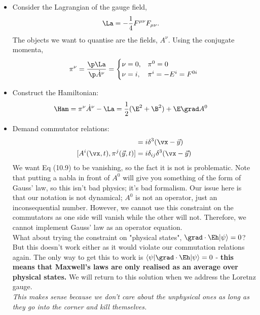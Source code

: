 \documentclass[a4paper, 11pt, normalem]{report}
\begin{document}
\begin{itemize}
    \item Consider the Lagrangian of the gauge field,
        \begin{align}
            \La &= -\frac14 F^{\mu\nu}F_{\mu\nu}.
        \end{align}
        The objects we want to quantise are the fields, $A^\nu$.
        Using the conjugate momenta,
        \begin{align}
            \pi^\nu &= \frac{\p\La}{\p\dot{A}^\nu} = \begin{cases} \nu = 0, & \pi^0 = 0 \\ \nu = i, & \pi^i = -E^i = F^{0i}\end{cases} \\
        \end{align}
    \item Construct the Hamiltonian:
        \begin{align}
            \Ham &= \pi^\nu\dot{A}^\nu - \La = \frac12(\E^2+\B^2) + \E\grad A^0
        \end{align}
    \item Demand commutator relations:
        \begin{align}
            [A^0(\vx,t),\pi^0(\vec{y},t)] &= i\delta^3(\vx-\vec{y}) \\
            [A^i(\vx,t),\pi^j(\vec{y},t)] &= i\delta_{ij}\delta^3(\vx-\vec{y})
        \end{align}
        We want Eq (10.9) to be vanishing, so the fact it is not is problematic. 
        Note that putting a nabla in front of $A^0$ will give you something of the form of Gauss' law, so this isn't bad physics; it's bad formalism.
        Our issue here is that our notation is not dynamical; $A^0$ is not an operator, just an inconsequential number.
        However, we cannot use this constraint on the commutators as one side will vanish while the other will not.
        Therefore, we cannot implement Gauss' law as an operator equation.\\
        What about trying the constraint on "physical states", $\grad\cdot\Eh|\psi\rangle = 0$?
        But this doesn't work either as it would violate our commutation relations again. 
        The only way to get this to work is $\langle\psi|\grad\cdot\Eh|\psi\rangle=0$ - \textbf{this means that Maxwell's laws are only realised as an average over physical states.}
        We will return to this solution when we address the Loretnz gauge.\\
        \textit{This makes sense because we don't care about the unphysical ones as long as they go into the corner and kill themselves.}

\end{itemize}
\end{document}
